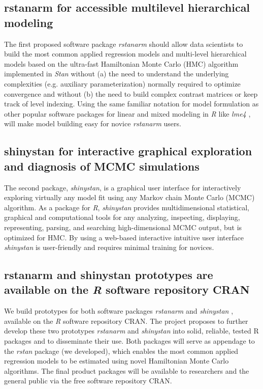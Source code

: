 \documentclass[11pt,notitlepage]{article}
\begin{document}
\subsection*{rstanarm for accessible multilevel hierarchical modeling}
The first proposed software package \textit{rstanarm} should allow data scientists to build the most common applied regression models and multi-level hierarchical models based on the ultra-fast Hamiltonian Monte Carlo (HMC) algorithm implemented in \textit{Stan} without (a) the need to understand the underlying complexities (e.g. auxiliary parameterization) normally required to optimize convergence and without (b) the need to build complex contrast matrices  or keep track of level indexing. Using the same familiar notation for model formulation as other popular software packages for linear and mixed modeling in \textit{R} like \textit{lme4} \cite{lme4}, will make model building easy for novice \textit{rstanarm} users. 

\subsection*{shinystan for interactive graphical exploration and diagnosis of MCMC simulations}  
The second package, \textit{shinystan}, is a graphical user interface for interactively exploring virtually any model fit using any Markov chain Monte Carlo (MCMC) algorithm. As a package for \textit{R}, \textit{shinystan}  provides multidimensional statistical, graphical and computational tools for any analyzing, inspecting, displaying, representing, parsing, and searching high-dimensional MCMC output, but is optimized for HMC. By using a web-based interactive intuitive user interface \textit{shinystan} is user-friendly and requires minimal training for novices.

\subsection*{rstanarm and shinystan prototypes are available on the \textit{R} software repository CRAN}
We build prototypes for both software packages \textit{rstanarm} \cite{rstanarm} and \textit{shinystan} \cite{shinystan, Team2015}, available on the \textit{R} software repository CRAN. The project proposes to further develop these two prototypes \textit{rstanarm} and \textit{shinystan} into solid, reliable, tested R packages and to disseminate their use. Both packages will serve as appendage to the \textit{rstan} package (we developed), which enables the most common applied regression models to be estimated using novel Hamiltonian Monte Carlo algorithms. The final product packages will be available to researchers and the general public via the free software repository CRAN. 
\end{document}
